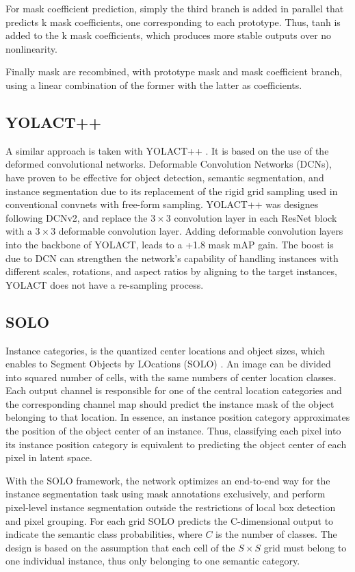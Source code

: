 For mask coefficient prediction, simply the third branch is added in parallel that predicts k mask coefficients, one corresponding to each prototype. Thus, tanh is added
to the k mask coefficients, which produces more stable outputs over no nonlinearity.

Finally mask are recombined, with prototype mask and mask coefficient branch, using a linear combination of the former with the latter as coefficients.

\subsection{YOLACT++}

A similar approach is taken with YOLACT++ \cite{2020}. It is based on the use of the deformed convolutional networks.
Deformable Convolution Networks (DCNs)\cite{dai2017deformable}, \cite{zhu2019deformable} have proven to be effective for object detection, semantic segmentation, and
instance segmentation due to its replacement of the rigid grid sampling used in conventional convnets with free-form sampling.
YOLACT++ was designes following DCNv2, and replace the $3\times 3$ convolution layer in each ResNet block with a $3\times 3$ deformable convolution layer.
Adding deformable convolution layers into the backbone of YOLACT, leads to a +1.8 mask mAP gain. The boost is due to DCN can strengthen the network’s capability of
handling instances with different scales, rotations, and aspect ratios by aligning to the target instances, YOLACT does not have a re-sampling process.
 
\subsection{SOLO}
Instance categories, is the quantized center locations and object sizes, which enables to Segment Objects by LOcations (SOLO) \cite{wang2020solov2}. An image can be
divided into squared number of cells, with the same numbers of center location classes. Each output channel is responsible for one of the central location categories
and the corresponding channel map should predict the instance mask of the object belonging to that location. In essence, an instance position category approximates
the position of the object center of an instance. Thus, classifying each pixel into its instance position category is equivalent to predicting the object center of
each pixel in latent space.

With the SOLO framework, the network optimizes an end-to-end way for the instance segmentation task using mask annotations exclusively, and perform pixel-level
instance segmentation outside the restrictions of local box detection and pixel grouping. For each grid SOLO predicts the C-dimensional output to indicate the
semantic class probabilities, where $C$ is the number of classes. The design is based on the assumption that each cell of the $S\times S$ grid must
belong to one individual instance, thus only belonging to one semantic category.

